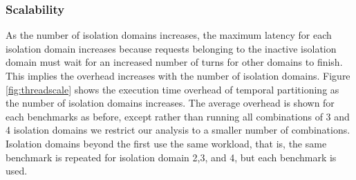 \begin{figure*}
    \begin{center}
        \vspace{-0.10in}
        \qquad
        \vspace{-0.10in}
        \caption{Effect of Turn Length on Memory Latency}
        \label{fig:latency}
    \end{center}
\end{figure*}

\subsubsection{Scalability}
As the number of isolation domains increases, the maximum latency for each 
isolation domain increases because requests belonging to the inactive isolation 
domain must wait for an increased number of turns for other domains to finish. This 
implies the overhead increases with the number of isolation domains. Figure 
\ref{fig:threadscale} shows the execution time overhead of temporal 
partitioning as the number of isolation domains increases. The average overhead is
shown for 
each benchmarks as before, except rather than running all combinations of 3 and 
4 isolation domains we restrict our analysis to a smaller number of combinations.
Isolation domains beyond the first use the same workload, that is, the same 
benchmark is repeated for isolation 
domain 2,3, and 4, but each benchmark is used.

\begin{figure*}
    \begin{center}
        \vspace{-0.10in}
        \caption{Effect of Scaling the Number of Isolation Domains}
        \label{fig:threadscale}
    \end{center}
\end{figure*}

